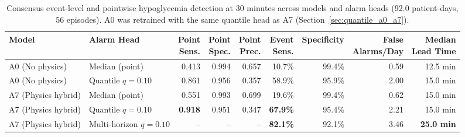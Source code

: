 \documentclass[journal]{IEEEtran}
\begin{document}
\begin{table}[t]
\centering
\caption{Consensus event-level and pointwise hypoglycemia detection at 30 minutes across models and alarm heads (92.0 patient-days, 56 episodes). A0 was retrained with the same quantile head as A7 (Section~\ref{sec:quantile_a0_a7}).}
\label{tab:hypo_event}
\footnotesize
\begin{tabular}{llrrrrrrr}
\toprule
Model & Alarm Head & \makecell{Point\\Sens.} & \makecell{Point\\Spec.} & \makecell{Point\\Prec.} & \makecell{Event\\Sens.} & Specificity & \makecell{False\\Alarms/Day} & \makecell{Median\\Lead Time} \\
\midrule
A0 (No physics) & Median (point) & 0.413 & 0.994 & 0.657 & 10.7\% & 99.4\% & 0.59 & 12.5 min \\
A0 (No physics) & Quantile $q=0.10$ & 0.861 & 0.956 & 0.357 & 58.9\% & 95.9\% & 2.00 & 15.0 min \\
\midrule
A7 (Physics hybrid) & Median (point) & 0.551 & 0.993 & 0.699 & 19.6\% & 99.4\% & 0.62 & 15.0 min \\
A7 (Physics hybrid) & Quantile $q=0.10$ & \textbf{0.918} & 0.951 & 0.347 & \textbf{67.9\%} & 95.4\% & 2.21 & 15.0 min \\
A7 (Physics hybrid) & Multi-horizon $q=0.10$ & -- & -- & -- & \textbf{82.1\%} & 92.1\% & 3.46 & \textbf{25.0 min} \\
\bottomrule
\end{tabular}
\end{table}
\end{document}
